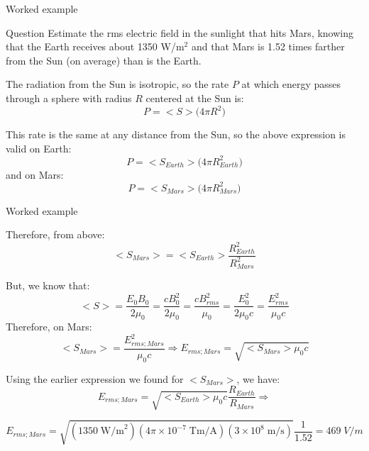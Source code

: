 {
\problemslide

%
%
%
%

\begin{frame}{Worked example}

\begin{blockexmplque}{Question}
  Estimate the rms electric field in the sunlight that hits Mars,
  knowing that the Earth receives about 1350 W/m$^2$ and that
  Mars is 1.52 times farther from the Sun (on average) than is
  the Earth.
\end{blockexmplque}

The radiation from the Sun is isotropic,
so the rate $P$ at which energy passes through a sphere with radius $R$
centered at the Sun is:
\begin{equation*}
    P = <S> \Big( 4\pi R^2 \Big)
\end{equation*}

This rate is the same at any distance from the Sun,
so the above expression is valid on Earth:
\begin{equation*}
    P = <S_{Earth}> \Big( 4\pi R_{Earth}^2 \Big)
\end{equation*}
and on Mars:
\begin{equation*}
    P = <S_{Mars}> \Big( 4\pi R_{Mars}^2 \Big)
\end{equation*}

\end{frame}

%
%
%
%

\begin{frame}{Worked example}

Therefore, from above:
\begin{equation*}
   <S_{Mars}> = <S_{Earth}> \frac{R_{Earth}^2}{R_{Mars}^2}
\end{equation*}

But, we know that:
\begin{equation*}
  <S> = \frac{E_0 B_0}{2\mu_0}
      = \frac{c B_0^2}{2\mu_0} = \frac{c B_{rms}^2}{\mu_0}
      = \frac{E_0^2}{2\mu_0 c} = \frac{E_{rms}^2}{\mu_0 c}
\end{equation*}
Therefore, on Mars:
\begin{equation*}
  <S_{Mars}> = \frac{E_{rms;Mars}^2}{\mu_0 c} \Rightarrow
  E_{rms;Mars} = \sqrt{<S_{Mars}> \mu_0 c}
\end{equation*}

Using the earlier expression we found for $<S_{Mars}>$, we have:
\begin{equation*}
  E_{rms;Mars} = \sqrt{<S_{Earth}> \mu_0 c} \frac{R_{Earth}}{R_{Mars}} \Rightarrow
\end{equation*}

\vspace{-0.2cm}
\begin{equation*}
  E_{rms;Mars} =
   \sqrt{(1350 \; \text{W/m}^2) (4\pi \times 10^{-7} \; \text{Tm/A}) (3\times 10^8 \; \text{m/s})}
   \frac{1}{1.52} = 469 \; V/m
\end{equation*}

\end{frame}

} %

